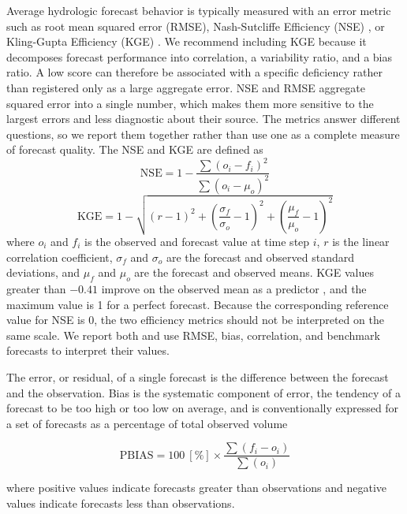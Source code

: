 \documentclass[MLA]{USG} %
\begin{document}
Average hydrologic forecast behavior is typically measured with an error metric such as root mean squared error (RMSE), Nash-Sutcliffe Efficiency (NSE) \citep{nashRiverFlowForecasting1970}, or Kling-Gupta Efficiency (KGE) \citep{guptaDecompositionMeanSquared2009}. We recommend including KGE because it decomposes forecast performance into correlation, a variability ratio, and a bias ratio. A low score can therefore be associated with a specific deficiency rather than registered only as a large aggregate error. NSE and RMSE aggregate squared error into a single number, which makes them more sensitive to the largest errors and less diagnostic about their source. The metrics answer different questions, so we report them together rather than use one as a complete measure of forecast quality. The NSE and KGE are defined as
\begin{equation}
    \text{NSE}=1 - \frac{\sum \left(o_i - f_i\right)^2}
{\sum \left(o_i - \mu_o\right)^2}
\end{equation}
\begin{equation}
    \text{KGE}=1-\sqrt{(r-1)^2+\left(\frac{\sigma_f}{\sigma_o}-1\right)^2+\left(\frac{\mu_f}{\mu_o}-1\right)^2}
\end{equation}
where \(o_i\) and \(f_i\) is the observed and forecast value at time step \(i\), $r$ is the linear correlation coefficient, $\sigma_f$ and $\sigma_o$ are the forecast and observed standard deviations, and $\mu_f$ and $\mu_o$ are the forecast and observed means. KGE values greater than $-0.41$ improve on the observed mean as a predictor \citep{knobenTechnicalNoteInherent2019a}, and the maximum value is 1 for a perfect forecast. Because the corresponding reference value for NSE is 0, the two efficiency metrics should not be interpreted on the same scale. We report both and use RMSE, bias, correlation, and benchmark forecasts to interpret their values.

The error, or residual, of a single forecast is the difference between the forecast and the observation. Bias is the systematic component of error, the tendency of a forecast to be too high or too low on average, and is conventionally expressed for a set of forecasts as a percentage of total observed volume

\begin{equation}
    \text{PBIAS} = 100\ [\%]\times\frac{\sum(f_i-o_i)}{\sum(o_i)}
\end{equation}

where positive values indicate forecasts greater than observations and negative values indicate forecasts less than observations.
\end{document}
